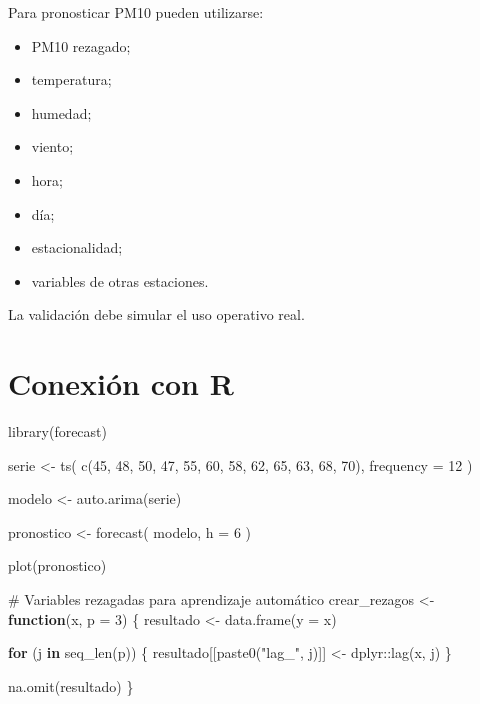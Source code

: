 \documentclass[
  spanish,
  10.5pt,
  letterpaper,
  DIV=11,
  numbers=noendperiod,
  oneside,
  open=any]{scrreprt}
\newenvironment{Shaded}{\begin{snugshade}}{\end{snugshade}}
\newcommand{\AttributeTok}[1]{\textcolor[rgb]{0.40,0.45,0.13}{#1}}
\newcommand{\CommentTok}[1]{\textcolor[rgb]{0.37,0.37,0.37}{#1}}
\newcommand{\ControlFlowTok}[1]{\textcolor[rgb]{0.00,0.23,0.31}{\textbf{#1}}}
\newcommand{\DecValTok}[1]{\textcolor[rgb]{0.68,0.00,0.00}{#1}}
\newcommand{\FunctionTok}[1]{\textcolor[rgb]{0.28,0.35,0.67}{#1}}
\newcommand{\NormalTok}[1]{\textcolor[rgb]{0.00,0.23,0.31}{#1}}
\newcommand{\OtherTok}[1]{\textcolor[rgb]{0.00,0.23,0.31}{#1}}
\newcommand{\SpecialCharTok}[1]{\textcolor[rgb]{0.37,0.37,0.37}{#1}}
\newcommand{\StringTok}[1]{\textcolor[rgb]{0.13,0.47,0.30}{#1}}
\providecommand{\tightlist}{%
  \setlength{\itemsep}{0pt}\setlength{\parskip}{0pt}}
\theoremstyle{definition}
\theoremstyle{definition}
\theoremstyle{plain}
\theoremstyle{remark}
\begin{document}
Para pronosticar PM10 pueden utilizarse:

\begin{itemize}
\tightlist
\item
  PM10 rezagado;
\item
  temperatura;
\item
  humedad;
\item
  viento;
\item
  hora;
\item
  día;
\item
  estacionalidad;
\item
  variables de otras estaciones.
\end{itemize}

La validación debe simular el uso operativo real.

\section*{Conexión con R}\label{conexiuxf3n-con-r-19}


\begin{Shaded}
\begin{Highlighting}[numbers=left,,]
\FunctionTok{library}\NormalTok{(forecast)}

\NormalTok{serie }\OtherTok{\textless{}{-}} \FunctionTok{ts}\NormalTok{(}
  \FunctionTok{c}\NormalTok{(}\DecValTok{45}\NormalTok{, }\DecValTok{48}\NormalTok{, }\DecValTok{50}\NormalTok{, }\DecValTok{47}\NormalTok{, }\DecValTok{55}\NormalTok{, }\DecValTok{60}\NormalTok{, }\DecValTok{58}\NormalTok{, }\DecValTok{62}\NormalTok{, }\DecValTok{65}\NormalTok{, }\DecValTok{63}\NormalTok{, }\DecValTok{68}\NormalTok{, }\DecValTok{70}\NormalTok{),}
  \AttributeTok{frequency =} \DecValTok{12}
\NormalTok{)}

\NormalTok{modelo }\OtherTok{\textless{}{-}} \FunctionTok{auto.arima}\NormalTok{(serie)}

\NormalTok{pronostico }\OtherTok{\textless{}{-}} \FunctionTok{forecast}\NormalTok{(}
\NormalTok{  modelo,}
  \AttributeTok{h =} \DecValTok{6}
\NormalTok{)}

\FunctionTok{plot}\NormalTok{(pronostico)}

\CommentTok{\# Variables rezagadas para aprendizaje automático}
\NormalTok{crear\_rezagos }\OtherTok{\textless{}{-}} \ControlFlowTok{function}\NormalTok{(x, }\AttributeTok{p =} \DecValTok{3}\NormalTok{) \{}
\NormalTok{  resultado }\OtherTok{\textless{}{-}} \FunctionTok{data.frame}\NormalTok{(}\AttributeTok{y =}\NormalTok{ x)}

  \ControlFlowTok{for}\NormalTok{ (j }\ControlFlowTok{in} \FunctionTok{seq\_len}\NormalTok{(p)) \{}
\NormalTok{    resultado[[}\FunctionTok{paste0}\NormalTok{(}\StringTok{"lag\_"}\NormalTok{, j)]] }\OtherTok{\textless{}{-}}\NormalTok{ dplyr}\SpecialCharTok{::}\FunctionTok{lag}\NormalTok{(x, j)}
\NormalTok{  \}}

  \FunctionTok{na.omit}\NormalTok{(resultado)}
\NormalTok{\}}
\end{Highlighting}
\end{Shaded}
\end{document}
